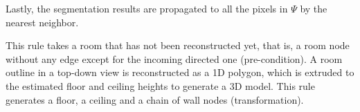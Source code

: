 Lastly, the segmentation results are propagated to all the pixels in $\Psi$
by the nearest neighbor.



 This rule takes a room that has
not been reconstructed yet, that is, a room node without any edge except
for the incoming directed one (pre-condition). A room outline in a top-down
view is reconstructed as a 1D polygon, which is extruded to the
estimated floor and ceiling heights to generate a 3D model. This rule
generates a floor, a ceiling and a chain of wall nodes (transformation).
%

